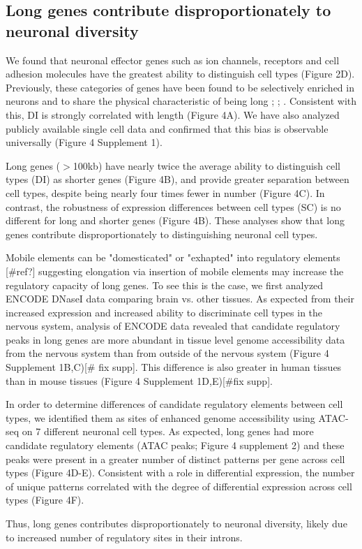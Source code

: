 \subsection{Long genes contribute disproportionately to neuronal diversity}

We found that neuronal effector genes such as ion channels, receptors and cell adhesion molecules have the greatest ability to distinguish cell types (Figure 2D). Previously, these categories of genes have been found to be selectively enriched in neurons and to share the physical characteristic of being long \cite{Sugino_2014}; \cite{Gabel_2015}; \cite{Zylka_2015}. Consistent with this, DI is strongly correlated with length (Figure 4A). We have also analyzed publicly available single cell data and confirmed that this bias is observable universally (Figure 4 Supplement 1). 

Long genes ($\gt$100kb) have nearly twice the average ability to distinguish cell types (DI) as shorter genes (Figure 4B), and provide greater separation between cell types, despite being nearly four times fewer in number (Figure 4C). In contrast, the robustness of expression differences between cell types (SC) is no different for long and shorter genes (Figure 4B). These analyses show that long genes contribute disproportionately to distinguishing neuronal cell types. 

Mobile elements can be "domesticated" or "exhapted" into regulatory elements [#ref?] suggesting elongation via insertion of mobile elements may increase the regulatory capacity of long genes. To see this is the case, we first analyzed ENCODE DNaseI data comparing brain vs. other tissues. As expected from their increased expression and increased ability to discriminate cell types in the nervous system, analysis of ENCODE data revealed that candidate regulatory peaks in long genes are more abundant in tissue level genome accessibility data from the nervous system than from outside of the nervous system (Figure 4 Supplement 1B,C)[# fix supp]. This difference is also greater in human tissues than in mouse tissues (Figure 4 Supplement 1D,E)[#fix supp].

In order to determine differences of candidate regulatory elements between cell types, we identified them as sites of enhanced genome accessibility using ATAC-seq \cite{Buenrostro_2013} on 7 different neuronal cell types. As expected, long genes had more candidate regulatory elements (ATAC peaks; Figure 4 supplement 2) and these peaks were present in a greater number of distinct patterns per gene across cell types (Figure 4D-E). Consistent with a role in differential expression, the number of unique patterns correlated with the degree of differential expression across cell types (Figure 4F).

Thus, long genes contributes disproportionately to neuronal diversity, likely due to increased number of regulatory sites in their introns. 


